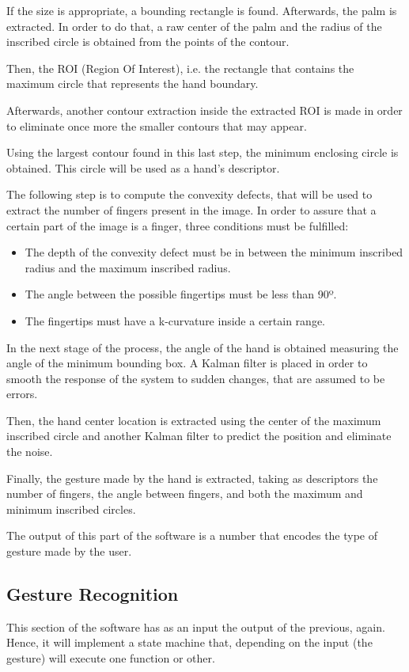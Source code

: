 \documentclass{article}
\begin{document}
If the size is appropriate, a bounding rectangle is found. Afterwards, the palm is extracted. In order to do that, a raw center of the palm and the radius of the inscribed circle is obtained from the points of the contour.

Then, the ROI (Region Of Interest), i.e. the rectangle that contains the maximum circle that represents the hand boundary.  

Afterwards, another contour extraction inside the extracted ROI is made in order to eliminate once more the smaller contours that may appear. 

Using the largest contour found in this last step, the minimum enclosing circle is obtained. This circle will be used as a hand's descriptor.

The following step is to compute the convexity defects, that will be used to extract the number of fingers present in the image. 
In order to assure that a certain part of the image is a finger, three conditions must be fulfilled: 
\begin{itemize}
\item The depth of the convexity defect must be in between the minimum inscribed radius and the maximum inscribed radius. 
\item The angle between the possible fingertips must be less than 90º. 
\item The fingertips must have a k-curvature inside a certain range.
\end{itemize}

In the next stage of the process, the angle of the hand is obtained measuring the angle of the minimum bounding box. A Kalman filter is placed in order to smooth the response of the system to sudden changes, that are assumed to be errors. 

Then, the hand center location is extracted using the center of the maximum inscribed circle and another Kalman filter to predict the position and eliminate the noise. 

Finally, the gesture made by the hand is extracted, taking as descriptors the number of fingers, the angle between fingers, and both the maximum and minimum inscribed circles. 

The output of this part of the software is a number that encodes the type of gesture made by the user.


\subsection{Gesture Recognition} 
This section of the software has as an input the output of the previous, again. Hence, it will implement a state machine that, depending on the input (the gesture) will execute one function or other. 
\end{document}
